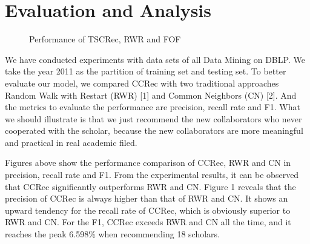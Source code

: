 \documentclass{chi-ext}
\begin{document}
\section{Evaluation and Analysis}
\begin{figure}
\centering
{}
\caption{Performance of TSCRec, RWR and FOF}
\label{fig:5}       %
\end{figure}
We have conducted experiments with data sets of all Data Mining on DBLP. We take the year 2011 as the partition of training set and testing set. To better evaluate our model, we compared CCRec with two traditional approaches Random Walk with Restart (RWR) [1] and Common Neighbors (CN) [2]. And the metrics to evaluate the performance are precision, recall rate and F1. What we should illustrate is that we just recommend the new collaborators who never cooperated with the scholar, because the new collaborators are more meaningful and practical in real academic filed.

Figures above show the performance comparison of CCRec, RWR and CN in precision, recall rate and F1. From the experimental results, it can be observed that CCRec significantly outperforms RWR and CN. Figure 1 reveals that the precision of CCRec is always higher than that of RWR and CN. It shows an upward tendency for the recall rate of CCRec, which is obviously superior to RWR and CN. For the F1, CCRec exceeds RWR and CN all the time, and it reaches the peak 6.598\% when recommending 18 scholars.
\end{document}
